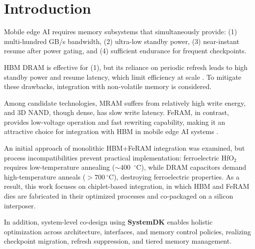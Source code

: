 \section{Introduction}
Mobile edge AI requires memory subsystems that simultaneously provide:
(1) multi-hundred GB/s bandwidth, 
(2) ultra-low standby power, 
(3) near-instant resume after power gating, and 
(4) sufficient endurance for frequent checkpoints.  

HBM DRAM is effective for (1), but its reliance on periodic refresh leads to high standby power and resume latency, 
which limit efficiency at scale \cite{ChoiIEDM2022,KimIEDM2021}.  
To mitigate these drawbacks, integration with non-volatile memory is considered.  

Among candidate technologies, MRAM suffers from relatively high write energy, 
and 3D NAND, though dense, has slow write latency.  
FeRAM, in contrast, provides low-voltage operation and fast rewriting capability, 
making it an attractive choice for integration with HBM in mobile edge AI systems \cite{MuellerIEDM2012,MartinVLSI2020,NohedaNature2023}.  

An initial approach of monolithic HBM+FeRAM integration was examined, 
but process incompatibilities prevent practical implementation:  
ferroelectric HfO$_2$ requires low-temperature annealing ($\sim$400~$^\circ$C), 
while DRAM capacitors demand high-temperature anneals ($>700~^\circ$C), 
destroying ferroelectric properties.  
As a result, this work focuses on chiplet-based integration, 
in which HBM and FeRAM dies are fabricated in their optimized processes and co-packaged on a silicon interposer.  

In addition, system-level co-design using \textbf{SystemDK} enables holistic optimization across architecture, interfaces, and memory control policies, 
realizing checkpoint migration, refresh suppression, and tiered memory management.  
